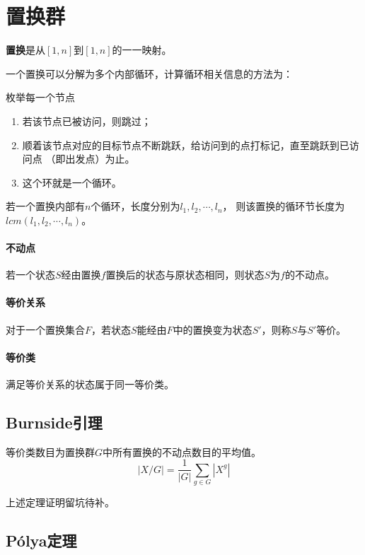 \section{置换群}
{\bfseries 置换}是从$[1,n]$到$[1,n]$的一一映射。

一个置换可以分解为多个内部循环，计算循环相关信息的方法为：

枚举每一个节点
\begin{enumerate}
	\item 若该节点已被访问，则跳过；
	\item 顺着该节点对应的目标节点不断跳跃，给访问到的点打标记，直至跳跃到已访问点
	      （即出发点）为止。
	\item 这个环就是一个循环。
\end{enumerate}
\begin{theorem}
	若一个置换内部有$n$个循环，长度分别为$l_1,l_2,\cdots,l_n$，
	则该置换的循环节长度为$lcm(l_1,l_2,\cdots,l_n)$。
\end{theorem}
\paragraph{不动点}
若一个状态$S$经由置换$f$置换后的状态与原状态相同，则状态$S$为$f$的不动点。
\paragraph{等价关系}
对于一个置换集合$F$，若状态$S$能经由$F$中的置换变为状态$S'$，则称$S$与$S'$等价。
\paragraph{等价类}
满足等价关系的状态属于同一等价类。

\subsection{Burnside引理}
\begin{lemma}
	等价类数目为置换群$G$中所有置换的不动点数目的平均值。
	\begin{displaymath}
		|X/G|=\frac{1}{|G|}\sum_{g\in G}|X^g|
	\end{displaymath}
\end{lemma}
上述定理证明留坑待补。
\subsection{Pólya定理}

